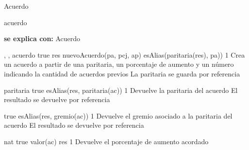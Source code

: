 \begin{interfaz}{Acuerdo}

\begin{iparamformales}{acuerdo}

\textbf{\large se explica con:} Acuerdo

\end{iparamformales}

{, , }{acuerdo}
{true}
{res \igobs nuevoAcuerdo(pa, pcj, ap) \land esAlias(paritaria(res), pa))}
{1}
{Crea un acuerdo a partir de una paritaria, un porcentaje de aumento y un n\'umero indicando la cantidad de acuerdos previos}
{La paritaria se guarda por referencia}

{}{paritaria}
{true}
{esAlias(res, paritaria(ac))}
{1}
{Devuelve la paritaria del acuerdo}
{El resultado se devuelve por referencia}

{true}
{esAlias(res, gremio(ac))}
{1}
{Devuelve el gremio asociado a la paritaria del acuerdo}
{El resultado se devuelve por referencia}

{}{nat}
{true}
{valor(ac) \igobs res}
{1}
{Devuelve el porcentaje de aumento acordado}
{}

\end{interfaz}